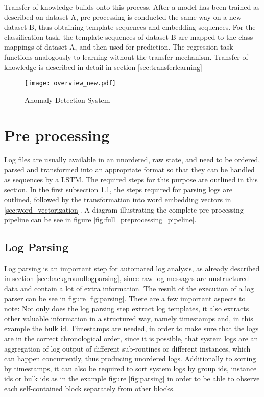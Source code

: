 Transfer of knowledge builds onto this process. After a model has been trained as described on dataset A, pre-processing is conducted the same way on a new dataset B, thus obtaining template sequences and embedding sequences. For the classification task, the template sequences of dataset B are mapped to the class mappings of dataset A, and then used for prediction. The regression task functions analogously to learning without the transfer mechanism. Transfer of knowledge is described in detail in section \ref{sec:transferlearning}

\begin{figure}[h]
	\centering
	\texttt{[image: overview\_new.pdf]}
	\caption{Anomaly Detection System}
	\label{fig:overall_system}
\end{figure}

\newpage
\section{Pre processing \label{sec:pre_processing}}
Log files are usually available in an unordered, raw state, and need to be ordered, parsed and transformed into an appropriate format so that they can be handled as sequences by a LSTM. The required steps for this purpose are outlined in this section. In the first subsection \ref{sec:conceptlogparsing}, the steps required for parsing logs are outlined, followed by the transformation into word embedding vectors in \ref{sec:word_vectorization}. A diagram illustrating the complete pre-processing pipeline can be see in figure \ref{fig:full_preprocessing_pipeline}.

\subsection{Log Parsing}\label{sec:conceptlogparsing}
Log parsing is an important step for automated log analysis, as already described in section \ref{sec:backgroundlogparsing}, since raw log messages are unstructured data and contain a lot of extra information. The result of the execution of a log parser can be see in figure \ref{fig:parsing}. There are a few important aspects to note: Not only does the log parsing step extract log templates, it also extracts other valuable information in a structured way, namely timestamps and, in this example the bulk id. Timestamps are needed, in order to make sure that the logs are in the correct chronological order, since it is possible, that system logs are an aggregation of log output of different sub-routines or different instances, which can happen concurrently, thus producing unordered logs. Additionally to sorting by timestamps, it can also be required to sort system logs by group ids, instance ids or bulk ids as in the example figure \ref{fig:parsing} in order to be able to observe each self-contained block separately from other blocks.

